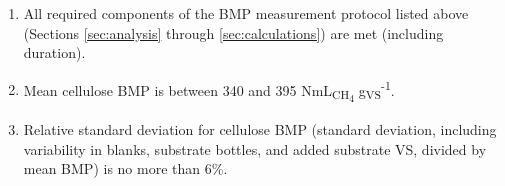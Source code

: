 \documentclass[]{article}
\begin{document}
\begin{enumerate}
  \item All required components of the BMP measurement protocol listed above (Sections \ref{sec:analysis} through \ref{sec:calculations}) are met (including duration).
  \item Mean cellulose BMP is between 340 and 395 NmL\textsubscript{CH\textsubscript{4}} g\textsubscript{VS}\textsuperscript{-1}.
  \item Relative standard deviation for cellulose BMP (standard deviation, including variability in blanks, substrate bottles, and added substrate VS, divided by mean BMP) is no more than 6\%.
\end{enumerate}


\end{document}
